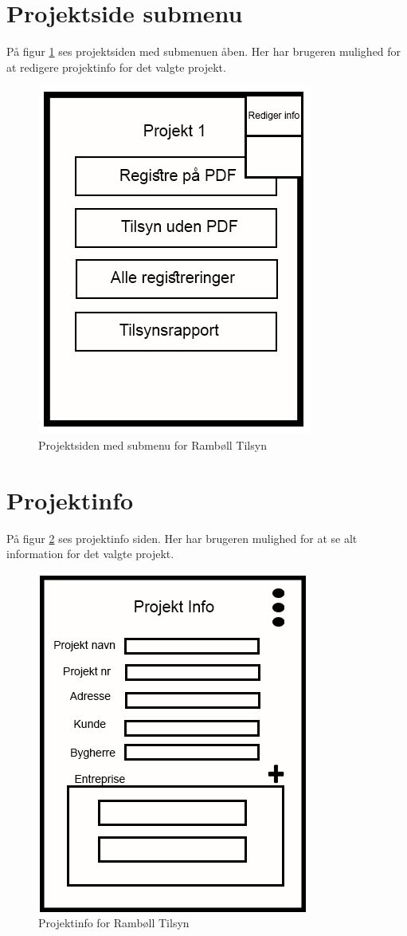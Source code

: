 \section{Projektside submenu}\label{sec:ProjektsideSubMock}
På figur \ref{fig:ProjektsideSubMock} ses projektsiden med submenuen åben. Her har brugeren mulighed for at redigere projektinfo for det valgte projekt.

\begin{figure}[H]
	\centering
	\includegraphics[width=0.4\linewidth]{MockUps/Mock/Ramboell-Registrer-sub}
	\caption{Projektsiden med submenu for Rambøll Tilsyn}
	\label{fig:ProjektsideSubMock}
\end{figure}

\section{Projektinfo}\label{sec:ProjektinfoMock}
På figur \ref{fig:ProjektinfoMock} ses projektinfo siden. Her har brugeren mulighed for at se alt information for det valgte projekt.

\begin{figure}[H]
	\centering
	\includegraphics[width=0.4\linewidth]{MockUps/Mock/Ramboell-ProjektInfo}
	\caption{Projektinfo for Rambøll Tilsyn}
	\label{fig:ProjektinfoMock}
\end{figure}

